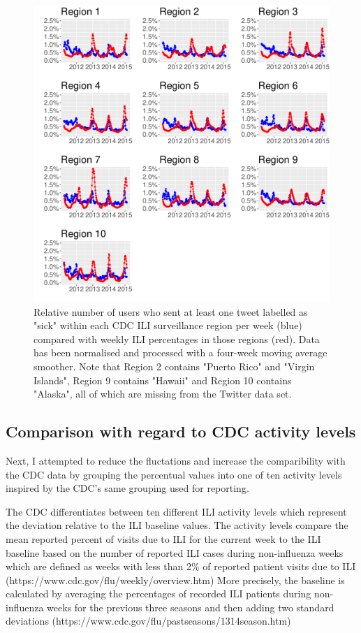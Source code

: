 \documentclass[11pt, a4paper]{article}\usepackage[]{graphicx}\usepackage[]{color}
\begin{document}
\begin{figure}[h]
\centering
\includegraphics[width=1\linewidth]{cdc_twitter_comp_regs_ma4_user.pdf}
\caption{Relative number of users who sent at least one tweet labelled as "sick" within each CDC ILI surveillance region per week (blue) compared with weekly ILI percentages in those regions (red). Data has been normalised and processed with a four-week moving average smoother. Note that Region 2 contains "Puerto Rico" and "Virgin Islands", Region 9 contains "Hawaii" and Region 10 contains "Alaska", all of which are missing from the Twitter data set.}
\label{fig:cdc_tw_comp_regs_ma4}
\end{figure}

\subsection{Comparison with regard to CDC activity levels}
Next, I attempted to reduce the fluctations and increase the comparibility with the CDC data by grouping the percentual values into one of ten activity levels inspired by the CDC's same grouping used for reporting.\newline

The CDC differentiates between ten different ILI activity levels which represent the deviation relative to the ILI baseline values. The activity levels compare the mean reported percent of visits due to ILI for the current week to the ILI baseline based on the number of reported ILI cases during non-influenza weeks which are defined as weeks with less than 2\% of reported patient visits due to ILI (https://www.cdc.gov/flu/weekly/overview.htm) More precisely, the baseline is calculated by averaging the percentages of recorded ILI patients during non-influenza weeks for the previous three seasons and then adding two standard deviations (https://www.cdc.gov/flu/pastseasons/1314season.htm)
\end{document}
